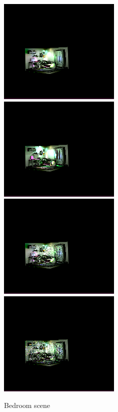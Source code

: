 \documentclass[twocolumn]{article}
\begin{document}
\begin{figure}[htbp]
    \centering
    \includegraphics[height=5cm]{img/bedroom-1.png}
    \includegraphics[height=5cm]{img/bedroom-2.png}
    \includegraphics[height=5cm]{img/bedroom-3.png}
    \includegraphics[height=5cm]{img/bedroom-4.png}
    \caption{Bedroom scene}
    \label{fig:bedroom}
\end{figure}
\end{document}
